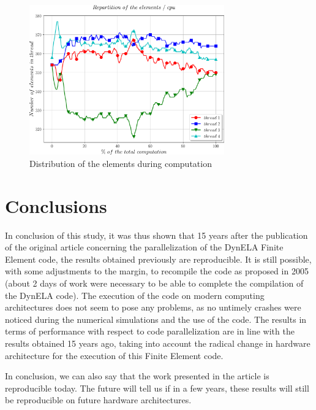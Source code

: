 \begin{figure}[h!] 
  \centering
  \includegraphics[width=0.75\textwidth]{./timethreads.pdf}
  \caption{Distribution of the elements during computation}
  \label{timethreads}
\end{figure}

\section {Conclusions}

In conclusion of this study, it was thus shown that 15 years after the publication of the original article \cite{Pantale:2005} concerning the parallelization of the DynELA Finite Element code, the results obtained previously are reproducible. It is still possible, with some adjustments to the margin, to recompile the code as proposed in 2005 (about 2 days of work were necessary to be able to complete the compilation of the DynELA code). The execution of the code on modern computing architectures does not seem to pose any problems, as no untimely crashes were noticed during the numerical simulations and the use of the code. The results in terms of performance with respect to code parallelization are in line with the results obtained 15 years ago, taking into account the radical change in hardware architecture for the execution of this Finite Element code.

In conclusion, we can also say that the work presented in the article \cite{Pantale:2005} is reproducible today. The future will tell us if in a few years, these results will still be reproducible on future hardware architectures.

